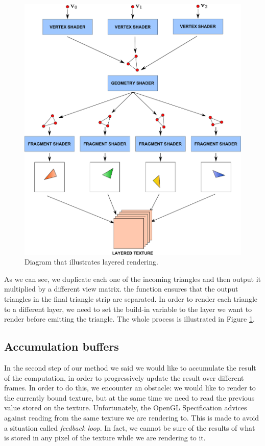 \begin{figure}[!ht]
\centering
\includegraphics[width=\linewidth]{images/method/layered.pdf}
\caption{Diagram that illustrates layered rendering.}
\label{fig:layered}
\end{figure} 

As we can see, we duplicate each one of the incoming triangles and then output it multiplied by a different view matrix. the  function ensures that the output triangles in the final triangle strip are separated. In order to render each triangle to a different layer, we need to set the build-in variable  to the layer we want to render before emitting the triangle. The whole process is illustrated in Figure \ref{fig:layered}.

\subsection{Accumulation buffers}
\label{sec:accumulation}
In the second step of our method we said we would like to accumulate the result of the computation, in order to progressively update the result over different frames. In order to do this, we encounter an obstacle: we would like to render to the currently bound texture, but at the same time we need to read the previous value stored on the texture. Unfortunately, the OpenGL Specification \citep{openglspec} advices against reading from the same texture we are rendering to. This is made to avoid a situation called \emph{feedback loop}. In fact, we cannot be sure of the results of what is stored in any pixel of the texture while we are rendering to it. 

